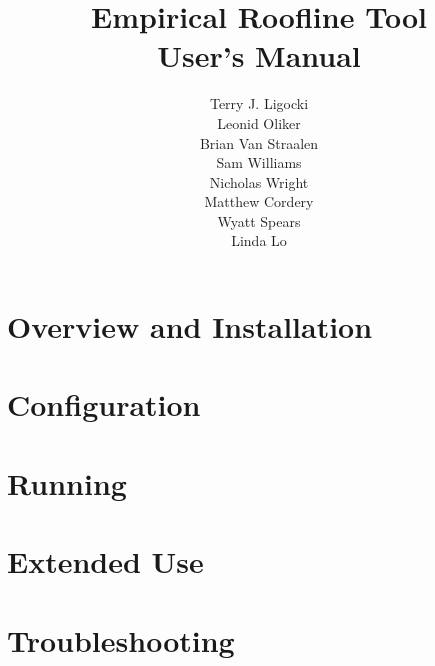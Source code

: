 \documentclass[12pt,titlepage]{article}
\title{Empirical Roofline Tool \\
       User's Manual
      }
\author{Terry J. Ligocki \\
        Leonid Oliker \\
        Brian Van Straalen \\
        Sam Williams \\
        Nicholas Wright \\
        Matthew Cordery \\
        Wyatt Spears \\
        Linda Lo
       }
\begin{document}
\maketitle

\tableofcontents
\newpage


\section{Overview and Installation}
\label{section:overview}


\section{Configuration}
\label{section:configuration}


\section{Running}
\label{section:running}


\section{Extended Use}
\label{section:extended}


\section{Troubleshooting}
\label{section:trouble}

\end{document}
